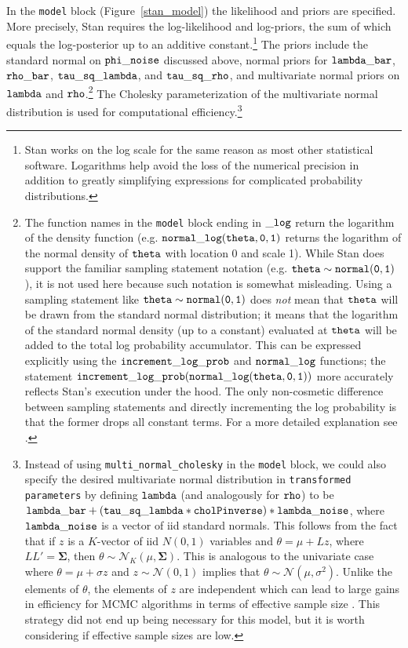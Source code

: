In the {\tt model} block (Figure~\ref{stan_model}) the likelihood and priors are specified. More precisely, Stan requires the log-likelihood and log-priors, the sum of which equals the log-posterior up to an additive constant.\footnote{Stan works on the log scale for the same reason as most other statistical software. Logarithms help avoid the loss of the numerical precision in addition to greatly simplifying expressions for complicated probability distributions.}
The priors include the standard normal on ${\tt phi\_noise}$ discussed above, normal priors for ${\tt lambda\_bar}$, ${\tt rho\_bar}$, ${\tt tau\_sq\_lambda}$, and ${\tt tau\_sq\_rho}$, and multivariate normal priors on ${\tt lambda}$ and ${\tt rho}$.\footnote{The function names in the {\tt model} block ending in ${\tt\_log}$ return the logarithm of the density function (e.g. ${\tt normal\_log(theta,0,1)}$ returns the logarithm of the normal density of ${\tt theta}$  with location 0 and scale 1). While Stan does support the familiar sampling statement notation (e.g. ${\tt theta \sim normal(0,1)}$), it is not used here because such notation is somewhat misleading. Using a sampling statement like ${\tt theta \sim normal(0,1)}$ does {\it not} mean that ${\tt theta}$ will be drawn from the standard normal distribution; it means that the logarithm of the standard normal density (up to a constant) evaluated at ${\tt theta}$ will be added to the total log probability accumulator. This can be expressed explicitly using the ${\tt increment\_log\_prob}$ and ${\tt normal\_log}$ functions; the statement ${\tt increment\_log\_prob(normal\_log(theta,0,1))}$ more accurately reflects Stan's execution under the hood. The only non-cosmetic difference between sampling statements and directly incrementing the log probability is that the former drops all constant terms. For a more detailed explanation see .} The Cholesky parameterization of the multivariate normal distribution is used for computational efficiency.\footnote{Instead of using {\tt multi\_normal\_cholesky} in the {\tt model} block, we could also specify the desired multivariate normal distribution in {\tt transformed parameters} by defining ${\tt lambda}$ (and analogously for ${\tt rho}$) to be  ${\tt lambda\_bar + (tau\_sq\_lambda * cholPinverse) * lambda\_noise}$, where ${\tt lambda\_noise}$ is a vector of iid standard normals. This follows from the fact that if $z$ is a $K$-vector of iid $N(0,1)$ variables and $\theta = \mu + L z$, where $LL' = \boldsymbol{\Sigma}$, then $\theta \sim \mathcal{N}_K (\mu, \boldsymbol{\Sigma})$. This is analogous to the univariate case where $\theta = \mu + \sigma z$ and $z \sim \mathcal{N}(0,1)$ implies that $\theta \sim \mathcal{N}(\mu, \sigma^2)$. Unlike the elements of $\theta$, the elements of $z$ are independent which can lead to large gains in efficiency for MCMC algorithms in terms of effective sample size . This strategy did not end up being necessary for this model, but it is worth considering if effective sample sizes are low.} 

